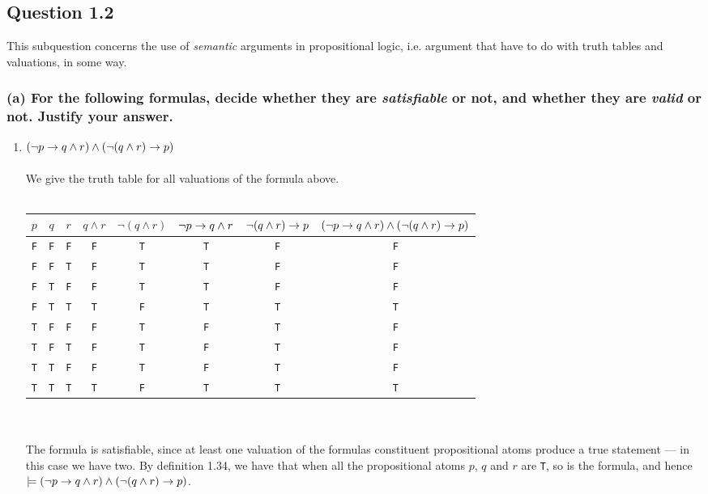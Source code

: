 \newpage
\subsection*{Question 1.2}
This subquestion concerns the use of {\it semantic} arguments in propositional
logic, i.e. argument that have to do with truth tables and valuations, in some
way.

\subsubsection*{(a) \mdseries For the following formulas, decide whether they
are {\it satisfiable} or not, and whether they are {\it valid} or not. Justify
your answer.}
\begin{enumerate}[i]
	\item
	{
	$(\neg p \to q \land r) \land (\neg (q \land r) \to p)$ \\\\
	We give the truth table for all valuations of the formula above. \\\\
	\begin{tabular}{ccccccc|c}
		$p$ & $q$ & $r$ &
		$q \land r$ &
		$\neg (q \land r)$ &
		$\neg p \to q \land r$ &
		$\neg (q \land r) \to p$ &
		$(\neg p \to q \land r) \land (\neg (q \land r) \to p)$ \\ \hline
		{\tt F} & {\tt F} & {\tt F} & {\tt F} & {\tt T} & {\tt T} & {\tt F} & {\tt F} \\
		{\tt F} & {\tt F} & {\tt T} & {\tt F} & {\tt T} & {\tt T} & {\tt F} & {\tt F} \\
		{\tt F} & {\tt T} & {\tt F} & {\tt F} & {\tt T} & {\tt T} & {\tt F} & {\tt F} \\
		{\tt F} & {\tt T} & {\tt T} & {\tt T} & {\tt F} & {\tt T} & {\tt T} & {\tt T} \\
		{\tt T} & {\tt F} & {\tt F} & {\tt F} & {\tt T} & {\tt F} & {\tt T} & {\tt F} \\
		{\tt T} & {\tt F} & {\tt T} & {\tt F} & {\tt T} & {\tt F} & {\tt T} & {\tt F} \\
		{\tt T} & {\tt T} & {\tt F} & {\tt F} & {\tt T} & {\tt F} & {\tt T} & {\tt F} \\
		{\tt T} & {\tt T} & {\tt T} & {\tt T} & {\tt F} & {\tt T} & {\tt T} & {\tt T} \\
	\end{tabular} \\\\
	The formula is satisfiable, since at least one valuation of the formulas
	constituent propositional atoms produce a true statement --- in this case
	we have two. By definition 1.34\cite{HR}, we have that when all the
	propositional atoms $p$, $q$ and $r$ are {\tt T}, so is the formula, and
	hence $\models (\neg p \to q \land r) \land (\neg (q \land r) \to p)$.
	}
	

\end{enumerate}
